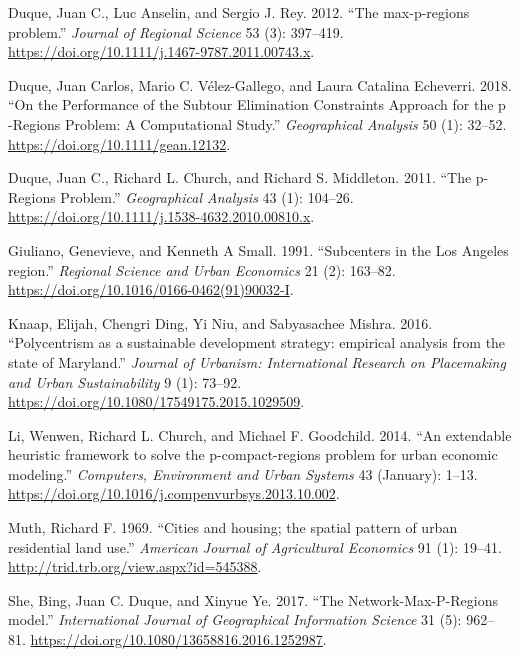 \documentclass[11pt,article,oneside]{memoir}
\newlength{\cslhangindent}
\newenvironment{cslreferences}%
  {\setlength{\parindent}{0pt}%
  \everypar{\setlength{\hangindent}{\cslhangindent} \setlength{\parskip}{6pt}}\ignorespaces}%
  {\par}
\begin{document}
\hypertarget{refs}{}
\begin{cslreferences}
\leavevmode\hypertarget{ref-duque_max-p-regions_2012}{}%
Duque, Juan C., Luc Anselin, and Sergio J. Rey. 2012. ``The
max-p-regions problem.'' \emph{Journal of Regional Science} 53 (3):
397--419. \url{https://doi.org/10.1111/j.1467-9787.2011.00743.x}.

\leavevmode\hypertarget{ref-Duque2017}{}%
Duque, Juan Carlos, Mario C. Vélez-Gallego, and Laura Catalina
Echeverri. 2018. ``On the Performance of the Subtour Elimination
Constraints Approach for the p -Regions Problem: A Computational
Study.'' \emph{Geographical Analysis} 50 (1): 32--52.
\url{https://doi.org/10.1111/gean.12132}.

\leavevmode\hypertarget{ref-Duque2011a}{}%
Duque, Juan C., Richard L. Church, and Richard S. Middleton. 2011. ``The
p-Regions Problem.'' \emph{Geographical Analysis} 43 (1): 104--26.
\url{https://doi.org/10.1111/j.1538-4632.2010.00810.x}.

\leavevmode\hypertarget{ref-Giuliano1991}{}%
Giuliano, Genevieve, and Kenneth A Small. 1991. ``Subcenters in the Los
Angeles region.'' \emph{Regional Science and Urban Economics} 21 (2):
163--82. \url{https://doi.org/10.1016/0166-0462(91)90032-I}.

\leavevmode\hypertarget{ref-Knaap2016}{}%
Knaap, Elijah, Chengri Ding, Yi Niu, and Sabyasachee Mishra. 2016.
``Polycentrism as a sustainable development strategy: empirical analysis
from the state of Maryland.'' \emph{Journal of Urbanism: International
Research on Placemaking and Urban Sustainability} 9 (1): 73--92.
\url{https://doi.org/10.1080/17549175.2015.1029509}.

\leavevmode\hypertarget{ref-Li2014}{}%
Li, Wenwen, Richard L. Church, and Michael F. Goodchild. 2014. ``An
extendable heuristic framework to solve the p-compact-regions problem
for urban economic modeling.'' \emph{Computers, Environment and Urban
Systems} 43 (January): 1--13.
\url{https://doi.org/10.1016/j.compenvurbsys.2013.10.002}.

\leavevmode\hypertarget{ref-Muth1969}{}%
Muth, Richard F. 1969. ``Cities and housing; the spatial pattern of
urban residential land use.'' \emph{American Journal of Agricultural
Economics} 91 (1): 19--41.
\url{http://trid.trb.org/view.aspx?id=545388}.

\leavevmode\hypertarget{ref-She2017}{}%
She, Bing, Juan C. Duque, and Xinyue Ye. 2017. ``The
Network-Max-P-Regions model.'' \emph{International Journal of
Geographical Information Science} 31 (5): 962--81.
\url{https://doi.org/10.1080/13658816.2016.1252987}.
\end{cslreferences}
\end{document}
